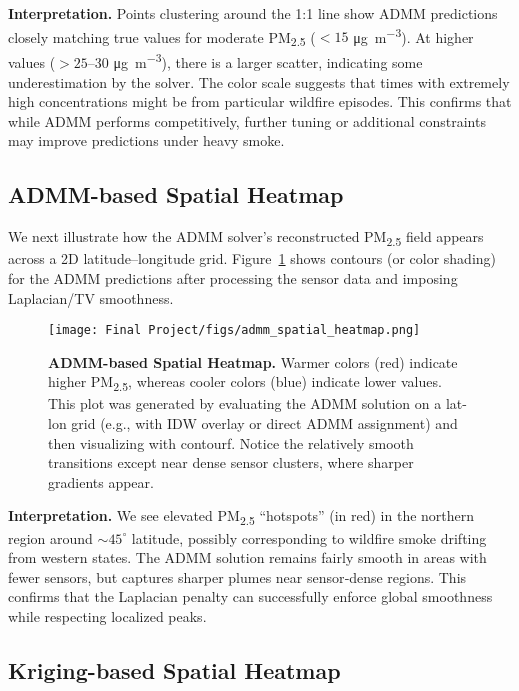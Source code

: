 \documentclass[12pt]{article}                                %
\begin{document}
\noindent
\textbf{Interpretation.}
Points clustering around the 1:1 line show ADMM predictions closely matching true values for moderate PM\textsubscript{2.5} (\(<15\) \si{\micro\gram\per\cubic\meter}). 
At higher values (\(>25\)--\(30\) \si{\micro\gram\per\cubic\meter}), there is a larger scatter, indicating some underestimation by the solver. The color scale suggests that times with extremely high concentrations might be from particular wildfire episodes. This confirms that while ADMM performs competitively, further tuning or additional constraints may improve predictions under heavy smoke.

\subsection{ADMM-based Spatial Heatmap}

We next illustrate how the ADMM solver’s reconstructed PM\textsubscript{2.5} field appears across a 2D latitude–longitude grid. 
Figure~\ref{fig:admmHeatmap} shows contours (or color shading) for the ADMM predictions after processing the sensor data and imposing Laplacian/TV smoothness.

\begin{figure}[H]  %
    \centering
    \texttt{[image: Final Project/figs/admm\_spatial\_heatmap.png]}
    \caption{\textbf{ADMM-based Spatial Heatmap.}
    Warmer colors (red) indicate higher PM\textsubscript{2.5}, whereas cooler colors (blue) indicate lower values. This plot was generated by evaluating the ADMM solution on a lat-lon grid (e.g., with IDW overlay or direct ADMM assignment) and then visualizing with contourf. 
    Notice the relatively smooth transitions except near dense sensor clusters, where sharper gradients appear.}
    \label{fig:admmHeatmap}
\end{figure}

\noindent
\textbf{Interpretation.}
We see elevated PM\textsubscript{2.5} “hotspots” (in red) in the northern region around \(\sim 45^\circ\) latitude, possibly corresponding to wildfire smoke drifting from western states. The ADMM solution remains fairly smooth in areas with fewer sensors, but captures sharper plumes near sensor‐dense regions. This confirms that the Laplacian penalty can successfully enforce global smoothness while respecting localized peaks.

\subsection{Kriging-based Spatial Heatmap}
\end{document}
